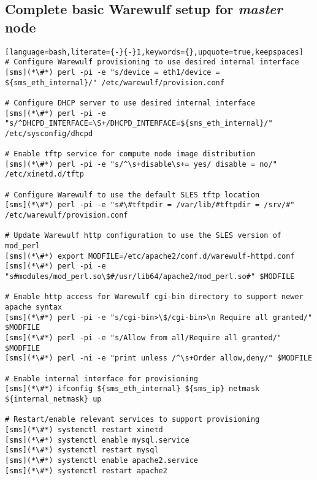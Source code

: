 \documentclass[letterpaper]{article}
\begin{document}
\subsection{Complete basic Warewulf setup for {\em master} node} \label{sec:setup_ww}



\begin{lstlisting}[language=bash,literate={-}{-}1,keywords={},upquote=true,keepspaces]
# Configure Warewulf provisioning to use desired internal interface
[sms](*\#*) perl -pi -e "s/device = eth1/device = ${sms_eth_internal}/" /etc/warewulf/provision.conf

# Configure DHCP server to use desired internal interface
[sms](*\#*) perl -pi -e "s/^DHCPD_INTERFACE=\S+/DHCPD_INTERFACE=${sms_eth_internal}/" /etc/sysconfig/dhcpd

# Enable tftp service for compute node image distribution
[sms](*\#*) perl -pi -e "s/^\s+disable\s+= yes/ disable = no/" /etc/xinetd.d/tftp

# Configure Warewulf to use the default SLES tftp location
[sms](*\#*) perl -pi -e "s#\#tftpdir = /var/lib/#tftpdir = /srv/#" /etc/warewulf/provision.conf

# Update Warewulf http configuration to use the SLES version of mod_perl
[sms](*\#*) export MODFILE=/etc/apache2/conf.d/warewulf-httpd.conf
[sms](*\#*) perl -pi -e "s#modules/mod_perl.so\$#/usr/lib64/apache2/mod_perl.so#" $MODFILE

# Enable http access for Warewulf cgi-bin directory to support newer apache syntax
[sms](*\#*) perl -pi -e "s/cgi-bin>\$/cgi-bin>\n Require all granted/" $MODFILE
[sms](*\#*) perl -pi -e "s/Allow from all/Require all granted/" $MODFILE
[sms](*\#*) perl -ni -e "print unless /^\s+Order allow,deny/" $MODFILE

# Enable internal interface for provisioning
[sms](*\#*) ifconfig ${sms_eth_internal} ${sms_ip} netmask ${internal_netmask} up

# Restart/enable relevant services to support provisioning
[sms](*\#*) systemctl restart xinetd
[sms](*\#*) systemctl enable mysql.service
[sms](*\#*) systemctl restart mysql
[sms](*\#*) systemctl enable apache2.service
[sms](*\#*) systemctl restart apache2
\end{lstlisting}
\end{document}
